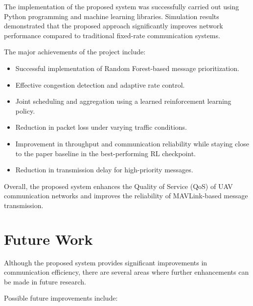 The implementation of the proposed system was 
successfully carried out using Python programming 
and machine learning libraries. Simulation results 
demonstrated that the proposed approach significantly 
improves network performance compared to traditional 
fixed-rate communication systems.

The major achievements of the project include:

\begin{itemize}

\item Successful implementation of Random Forest-based 
message prioritization.

\item Effective congestion detection and adaptive 
rate control.

\item Joint scheduling and aggregation using a learned 
reinforcement learning policy.

\item Reduction in packet loss under varying 
traffic conditions.

\item Improvement in throughput and communication 
reliability while staying close to the paper baseline 
in the best-performing RL checkpoint.

\item Reduction in transmission delay for 
high-priority messages.

\end{itemize}

Overall, the proposed system enhances the Quality 
of Service (QoS) of UAV communication networks 
and improves the reliability of MAVLink-based 
message transmission.



\section{Future Work}

Although the proposed system provides significant 
improvements in communication efficiency, there 
are several areas where further enhancements can 
be made in future research.

Possible future improvements include:

